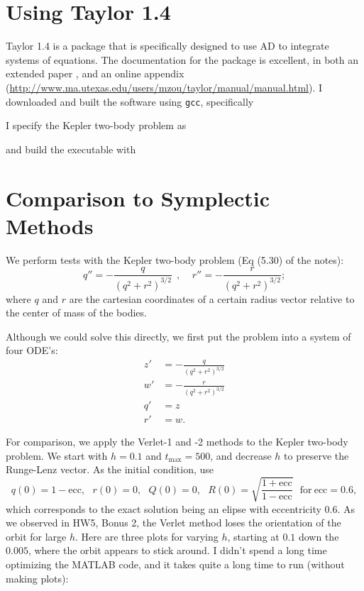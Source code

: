 \documentclass[11pt]{article}
\def\f{\frac }
\begin{document}
\pagebreak
\section{Using Taylor 1.4}

Taylor 1.4 is a package that is specifically designed to use AD to integrate systems of equations.
The documentation for the package is excellent, in both an extended paper \cite{jorba2005software}, and an online appendix (\url{http://www.ma.utexas.edu/users/mzou/taylor/manual/manual.html}).
I downloaded and built the software using \verb|gcc|, specifically



I specify the Kepler two-body problem as



and build the executable with



\pagebreak
\section{Comparison to Symplectic Methods}

We perform tests with the Kepler two-body problem (Eq (5.30) of the notes):
  \[ q'' = - \f{q}{(q^2+r^2)^{3/2}} ~~,~~~~~r'' = - \f{r}{(q^2+r^2)^{3/2}};  \]
where $q$ and $r$ are the cartesian coordinates of a certain radius vector relative to the center of mass of the bodies.

Although we could solve this directly, we first put the problem into a system of four ODE's:
\begin{align*} z' &= -\f{q}{(q^2+r^2)^{3/2}} \\
               w' &= - \f{r}{(q^2+r^2)^{3/2}} \\
               q' &= z\\
               r' &= w.\end{align*}

For comparison, we apply the Verlet-1 and -2 methods to the Kepler two-body problem.
We start with $h = 0.1$ and $t_{\max} =  500$, and decrease $h$ to preserve the Runge-Lenz vector.
As the initial condition, use
\[ q(0) = 1-\text{ecc}, ~~~r(0) = 0,~~~Q(0) = 0, ~~~ R(0) = \sqrt{\f{1+\text{ecc}}{1-\text{ecc}}} ~~~\text{for}~ \text{ecc} = 0.6,\]
which corresponds to the exact solution being an elipse with eccentricity 0.6.
As we observed in HW5, Bonus 2, the Verlet method loses the orientation of the orbit for large $h$.
Here are three plots for varying $h$, starting at $0.1$ down the $0.005$, where the orbit appears to stick around.
I didn't spend a long time optimizing the MATLAB code, and it takes quite a long time to run (without making plots):

\end{document}
